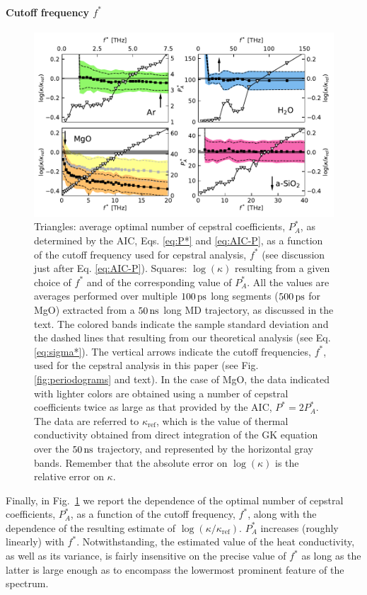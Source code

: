 \paragraph{Cutoff frequency $f^*$}
\begin{figure}[!tb]
    \centering
    \includegraphics[width=\textwidth]{chapters/chapter5/figures/kappa_vs_fstar.pdf}
    \caption{Triangles: average optimal number of cepstral coefficients, $P_A^*$, as determined by the AIC, Eqs. \eqref{eq:P*} and \eqref{eq:AIC-P}, as a function of the cutoff frequency used for cepstral analysis, $f^*$ (see discussion just after Eq. \eqref{eq:AIC-P}). Squares: $\log(\kappa)$ resulting from a given choice of $f^*$ and of the corresponding value of $P_A^*$. All the values are averages performed over multiple $100\,\mathrm{ps}$ long segments ($500\,\mathrm{ps}$ for MgO) extracted from a $50\,\mathrm{ns}$ long MD trajectory, as discussed in the text. The colored bands indicate the sample standard deviation and the dashed lines that resulting from our theoretical analysis (see Eq. \eqref{eq:sigma*}). The vertical arrows indicate the cutoff frequencies, $f^*$, used for the cepstral analysis in this paper (see Fig. \ref{fig:periodograms} and text). In the case of MgO, the data indicated with lighter colors are obtained using a number of cepstral coefficients twice as large as that provided by the AIC, $P^*=2P_A^*$. The data are referred to $\kappa_{\mathrm{ref}}$, which is the value of thermal conductivity obtained from direct integration of the GK equation over the $50\,\mathrm{ns}$ trajectory, and represented by the horizontal gray bands. Remember that the absolute error on $\log(\kappa)$ is the relative error on $\kappa$.}
    \label{fig:kappa_vs_fstar}
\end{figure}
Finally, in Fig.~\ref{fig:kappa_vs_fstar} we report the dependence of the optimal number of cepstral coefficients, $P_A^*$, as a function of the cutoff frequency, $f^*$, along with the dependence of the resulting estimate of $\log(\kappa/\kappa_{\mathrm{ref}})$. $P_A^*$ increases (roughly linearly) with $f^*$. Notwithstanding, the estimated value of the heat conductivity, as well as its variance, is fairly insensitive on the precise value of $f^*$ as long as the latter is large enough as to encompass the lowermost prominent feature of the spectrum. 
